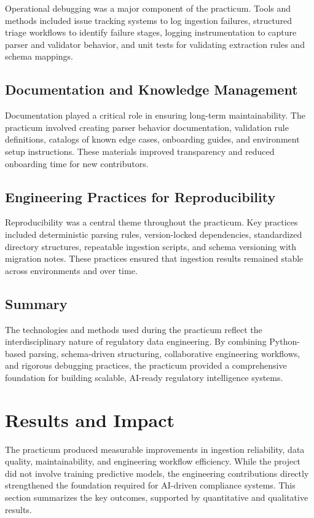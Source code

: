 \documentclass[sigconf]{acmart}
\begin{document}
Operational debugging was a major component of the practicum. Tools and methods included issue tracking systems to log ingestion failures, structured triage workflows to identify failure stages, logging instrumentation to capture parser and validator behavior, and unit tests for validating extraction rules and schema mappings.

\subsection{Documentation and Knowledge Management}

Documentation played a critical role in ensuring long-term maintainability. The practicum involved creating parser behavior documentation, validation rule definitions, catalogs of known edge cases, onboarding guides, and environment setup instructions. These materials improved transparency and reduced onboarding time for new contributors.

\subsection{Engineering Practices for Reproducibility}

Reproducibility was a central theme throughout the practicum. Key practices included deterministic parsing rules, version-locked dependencies, standardized directory structures, repeatable ingestion scripts, and schema versioning with migration notes. These practices ensured that ingestion results remained stable across environments and over time.

\subsection{Summary}

The technologies and methods used during the practicum reflect the interdisciplinary nature of regulatory data engineering. By combining Python-based parsing, schema-driven structuring, collaborative engineering workflows, and rigorous debugging practices, the practicum provided a comprehensive foundation for building scalable, AI-ready regulatory intelligence systems.


\section{Results and Impact}

The practicum produced measurable improvements in ingestion reliability, data quality, maintainability, and engineering workflow efficiency. While the project did not involve training predictive models, the engineering contributions directly strengthened the foundation required for AI-driven compliance systems. This section summarizes the key outcomes, supported by quantitative and qualitative results.
\end{document}
